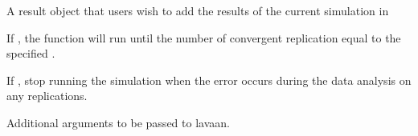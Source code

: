 \documentclass[a4paper]{book}
\begin{document}
\begin{Arguments}
\begin{ldescription}
\item[\code{previousSim}] 
A result object that users wish to add the results of the current simulation in

\item[\code{completeRep}] 
If , the function will run until the number of convergent replication equal to the specified .

\item[\code{stopOnError}]  
If , stop running the simulation when the error occurs during the data analysis on any replications.

\item[\code{...}]  
Additional arguments to be passed to lavaan.

\end{ldescription}
\end{Arguments}
%
\end{document}
